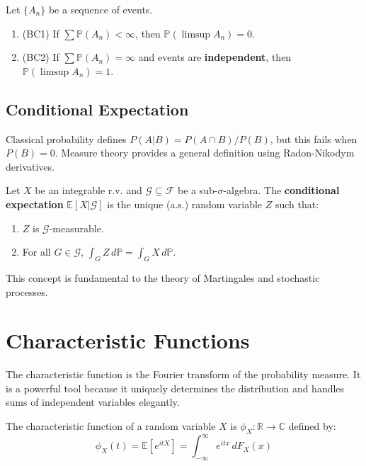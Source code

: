 \documentclass[oneside]{book}
\begin{document}
\begin{theorem}
Let $\{A_n\}$ be a sequence of events.
\begin{enumerate}
    \item (BC1) If $\sum \mathbb{P}(A_n) < \infty$, then $\mathbb{P}(\limsup A_n) = 0$.
    \item (BC2) If $\sum \mathbb{P}(A_n) = \infty$ and events are \textbf{independent}, then $\mathbb{P}(\limsup A_n) = 1$.
\end{enumerate}
\end{theorem}

\subsection{Conditional Expectation}

Classical probability defines $P(A|B) = P(A \cap B)/P(B)$, but this fails when $P(B)=0$. Measure theory provides a general definition using Radon-Nikodym derivatives.

\begin{definition}
Let $X$ be an integrable r.v. and $\mathcal{G} \subseteq \mathcal{F}$ be a sub-$\sigma$-algebra. The \textbf{conditional expectation} $\mathbb{E}[X|\mathcal{G}]$ is the unique (a.s.) random variable $Z$ such that:
\begin{enumerate}
    \item $Z$ is $\mathcal{G}$-measurable.
    \item For all $G \in \mathcal{G}$, $\int_G Z \, d\mathbb{P} = \int_G X \, d\mathbb{P}$.
\end{enumerate}
\end{definition}
This concept is fundamental to the theory of Martingales and stochastic processes.

\section{Characteristic Functions}

The characteristic function is the Fourier transform of the probability measure. It is a powerful tool because it uniquely determines the distribution and handles sums of independent variables elegantly.

\begin{definition}
The characteristic function of a random variable $X$ is $\phi_X: \mathbb{R} \to \mathbb{C}$ defined by:
\[ \phi_X(t) = \mathbb{E}[e^{itX}] = \int_{-\infty}^\infty e^{itx} \, dF_X(x) \]
\end{definition}
\end{document}
